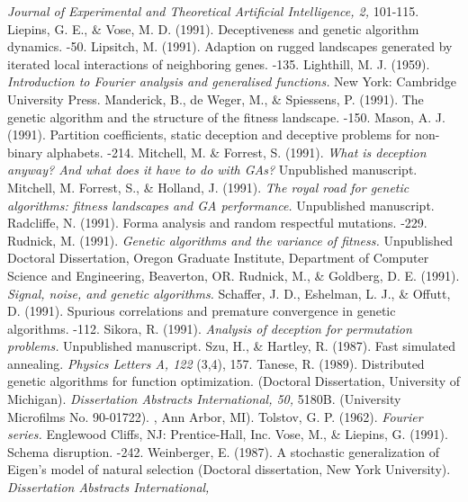 \begin{thereferences}
	{\em Journal of Experimental and Theoretical Artificial Intelligence,
	2,} 101-115.
 Liepins, G. E., \& Vose, M. D. (1991). Deceptiveness and 
	genetic algorithm dynamics. -50.
 Lipsitch, M. (1991).
	Adaption on rugged landscapes generated by iterated local
	interactions of neighboring genes.
	-135.
 Lighthill, M. J. (1959).
	{\em Introduction to Fourier analysis and generalised functions.}
	New York: Cambridge University Press.
 Manderick, B., de Weger, M., \& Spiessens, P. (1991).
	The genetic algorithm and the structure of the fitness landscape.
	-150.
 Mason, A. J. (1991). Partition coefficients, static deception
	and deceptive problems for non-binary alphabets.
	-214.
 Mitchell, M. \& Forrest, S. (1991).
	{\em What is deception anyway?  And what does it have to do with
	GAs?}
	Unpublished manuscript.
 Mitchell, M. Forrest, S., \& Holland, J. (1991).
	{\em The royal road for genetic algorithms: fitness
	landscapes and GA performance.}
	Unpublished manuscript.
 Radcliffe, N. (1991).
	Forma analysis and random respectful mutations.
	-229.
 Rudnick, M. (1991). {\em Genetic algorithms and the variance
	of fitness.}  Unpublished Doctoral Dissertation, Oregon
	Graduate Institute, Department of Computer Science and
	Engineering, Beaverton, OR.
 Rudnick, M., \& Goldberg, D. E. (1991). {\em Signal, noise, and
	genetic algorithms.}
 Schaffer, J. D., Eshelman, L. J., \&
	Offutt, D. (1991).
	Spurious correlations and premature convergence in genetic
	algorithms.
	-112.
 Sikora, R. (1991). {\em Analysis of deception for
	permutation problems.}  Unpublished manuscript.
 Szu, H., \& Hartley, R. (1987). Fast simulated annealing.
	{\em Physics Letters A, 122} (3,4), 157.
 Tanese, R. (1989).
	Distributed genetic algorithms for function optimization.
	(Doctoral Dissertation, University of Michigan).
	{\em Dissertation Abstracts International, 50,} 5180B.
	(University Microfilms No. 90-01722).
, Ann Arbor, MI).
 Tolstov, G. P. (1962).
	{\em Fourier series.}
	Englewood Cliffs, NJ: Prentice-Hall, Inc.
 Vose, M., \& Liepins, G. (1991). Schema disruption.
	-242.
 Weinberger, E. (1987).  A stochastic generalization
	of Eigen's model of natural selection (Doctoral dissertation,
	New York University).  {\em Dissertation Abstracts International,
}
\end{thereferences}
